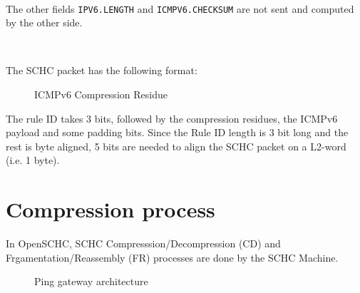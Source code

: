 \documentclass[onecolumn,12pt]{book}
\newcounter{c}
\begin{document}
~~

The other fields \texttt{IPV6.LENGTH} and \texttt{ICMPV6.CHECKSUM} are not sent and computed by the other side.

~~

The SCHC packet has the following format:

\begin{figure}[!ht] 
\centering 

\caption{ICMPv6 Compression Residue} 
\label{fig-residue} 
\end{figure} 

The rule ID takes 3 bits, followed by the compression residues, the ICMPv6 payload and some padding bits. Since the Rule ID length is 3 bit long and the rest is byte aligned, 5 bits are needed to align the SCHC packet on a  L2-word (i.e. 1 byte).

\section {Compression process}

In OpenSCHC, SCHC Compresssion/Decompression (CD) and Frgamentation/Reassembly (FR) processes are done by the SCHC Machine.

\begin{figure}[!ht] 
\centering 



\caption{Ping gateway architecture} 
\label{fig-schc-archi} 
\end{figure} 
\end{document}
